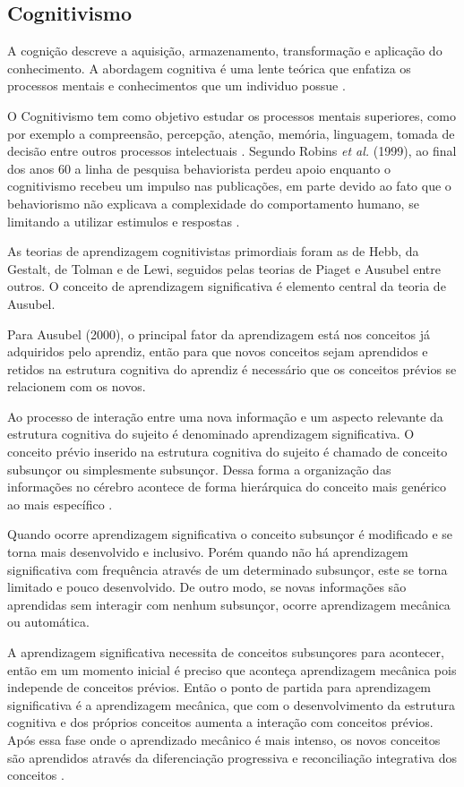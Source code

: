 \subsection{Cognitivismo}

A cognição descreve a aquisição, armazenamento, transformação e aplicação do conhecimento. A abordagem cognitiva é uma lente teórica que enfatiza os processos mentais e conhecimentos que um individuo possue \cite{matlin2004}.

O Cognitivismo tem como objetivo estudar os processos mentais superiores, como por exemplo a compreensão, percepção, atenção, memória, linguagem, tomada de decisão entre outros processos intelectuais \cite{moreira1999}.
Segundo Robins \textit{et al.} (1999), ao final dos anos 60 a linha de pesquisa behaviorista perdeu apoio enquanto o cognitivismo recebeu um impulso nas publicações, em parte devido ao fato que o behaviorismo não explicava a complexidade do comportamento humano, se limitando a utilizar estimulos e respostas \cite{robins1999, fragelli2010}.

As teorias de aprendizagem cognitivistas primordiais foram as de Hebb, da Gestalt, de Tolman e de Lewi, seguidos pelas teorias de Piaget e Ausubel entre outros. O conceito de aprendizagem significativa é elemento central da teoria de Ausubel.

Para Ausubel (2000), o principal fator da aprendizagem está nos conceitos já adquiridos pelo aprendiz, então para que novos conceitos sejam aprendidos e retidos na estrutura cognitiva do aprendiz é necessário que os conceitos prévios se relacionem com os novos.

Ao processo de interação entre uma nova informação e um aspecto relevante da estrutura cognitiva do sujeito é denominado aprendizagem significativa. O conceito prévio inserido na estrutura cognitiva do sujeito é chamado de conceito subsunçor ou simplesmente subsunçor. Dessa forma a organização das informações no cérebro acontece de forma hierárquica do conceito mais genérico ao mais específico \cite{ausubel2000}.

Quando ocorre aprendizagem significativa o conceito subsunçor é modificado e se torna mais desenvolvido e inclusivo. Porém quando não há aprendizagem significativa com frequência através de um determinado subsunçor, este se torna limitado e pouco desenvolvido. De outro modo, se novas informações são aprendidas sem interagir com nenhum subsunçor, ocorre aprendizagem mecânica ou automática.

A aprendizagem significativa necessita de conceitos subsunçores para acontecer, então em um momento inicial é preciso que aconteça aprendizagem mecânica pois independe de conceitos prévios. Então o ponto de partida para aprendizagem significativa é a aprendizagem mecânica, que com o desenvolvimento da estrutura cognitiva e dos próprios conceitos aumenta a interação com conceitos prévios. Após essa fase onde o aprendizado mecânico é mais intenso, os novos conceitos são aprendidos através da diferenciação progressiva e reconciliação integrativa dos conceitos \cite{ausubel2000, fragelli2010}.

